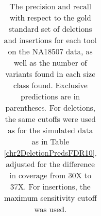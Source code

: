 \begin{table}
\begin{center}
\begin{tabular}{r|rrr|rrrrr}
\hline
\end{tabular}
\end{center}
\caption{The precision and recall with respect to the gold standard set of deletions and insertions for each tool on the NA18507 data, as well as the number of variants found in each size class found. Exclusive predictions are in parentheses. For deletions, the same cutoffs were used as for the simulated data as in Table \ref{chr2DeletionPredsFDR10}, adjusted for the difference in coverage from 30X to 37X. For insertions, the maximum sensitivity cutoff was used.}
\label{NA18507DeletionAndInsertionPreds}
\end{table}
